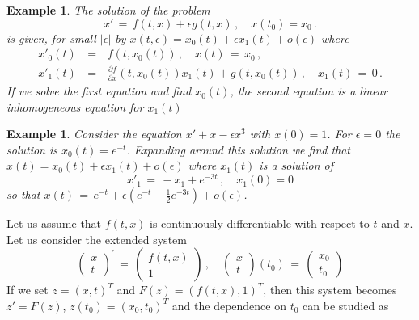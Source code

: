 \documentclass[12pt]{report}
\newtheorem{example}[theorem]{Example}
\newcommand{\nn}{\nonumber}
\begin{document}
\begin{example}{\rm  
The solution of the problem  
\begin{equation}
x' \,=\, f(t,x) + \epsilon g(t,x)\,, \quad x(t_0)=x_0 \,.
\end{equation}
is given, for small $|\epsilon|$ by $x(t,\epsilon)=x_0(t) + \epsilon
x_1(t) + o(\epsilon)$ where
\begin{eqnarray}
x'_0(t) \,&=&\, f(t, x_0(t)) \,, \quad x(t)\,=\,x_0 \,, \nn \\
x'_1(t)\,&=&\, \frac{\partial f}{\partial x} (t, x_0(t)) x_1(t) + 
g(t, x_0(t))\,, \quad x_1(t)\,=\,0 \,.
\end{eqnarray}
If we solve the first equation and find $x_0(t)$, the second equation
is a linear inhomogeneous equation for $x_1(t)$ }
\end{example}

\begin{example}{\rm
Consider the equation $x' + x - \epsilon x^3$ with $x(0)=1$. 
For $\epsilon =0$ the solution is  
$x_0(t)=e^{-t}$. Expanding  around this solution we find that $x(t) = x_0(t) 
+ \epsilon x_1(t) +  o(\epsilon)$ where $x_1(t)$ is a solution of 
\begin{equation}
x'_1 \,=\,  - x_1 + e^{-3t} \,, \quad x_1(0)=0 
\end{equation}
so that   $x(t) \,=\, e^{-t} + \epsilon(  e^{-t} - \frac{1}{2}e^{-3t}) 
+ o(\epsilon)$. 
}
\end{example}


Let us assume that $f(t,x)$ is continuously differentiable with
respect to $t$ and $x$. Let us consider the extended system
\begin{equation}
\left( \begin{array}{cc} x \\ t \end{array} \right)^{'} \,=\, \left(
\begin{array}{cc} f(t,x) \\ 1 \end{array} \right) \,, \quad \left(
\begin{array}{cc} x \\ t \end{array} \right)(t_0) \,=\, \left(
\begin{array}{cc} x_0 \\ t_0 \end{array} \right)
\end{equation}
If we set $z=(x,t)^T$ and $F(z)= (f(t, x) , 1)^T$, then this system
becomes $z'=F(z)$, $z(t_0)=(x_0,t_0)^T$ and the dependence on $t_0$
can be studied as
\end{document}

